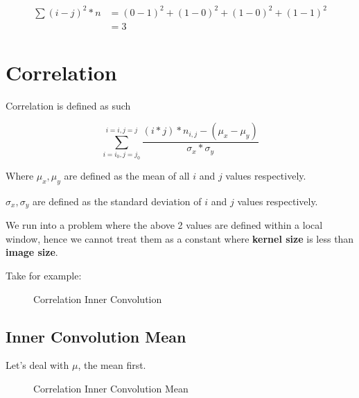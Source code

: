 \documentclass[article,oneside]{memoir}
\begin{document}
\begin{align*}
\sum(i - j)^2*n
&= (0 - 1) ^ 2 + (1 - 0) ^ 2 + (1 - 0) ^ 2 + (1 - 1) ^ 2\\
&= 3
\end{align*}

\section{Correlation}

Correlation is defined as such

$$
\sum_{i=i_0,j=j_0}^{i=i,j=j}
\frac{(i * j) * n_{i,j} - (\mu_x - \mu_y)}
{\sigma_x * \sigma_y}
$$

Where $\mu_x,\mu_y$ are defined as the mean of all $i$ and $j$ values respectively.

$\sigma_x,\sigma_y$ are defined as the standard deviation of $i$ and $j$ values respectively.

We run into a problem where the above 2 values are defined within a local window, hence we cannot treat them as a constant where \textbf{kernel size} is less than \textbf{image size}.

Take for example:

\begin{figure}[H]
\centering
{}
\caption{Correlation Inner Convolution}
\label{fig:label}
\end{figure}

\subsection{Inner Convolution Mean}

Let's deal with $\mu$, the mean first.

\begin{figure}[H]
\centering
{}
\caption{Correlation Inner Convolution Mean}
\label{Correlation Inner Convolution Mean}
\end{figure}
\end{document}
